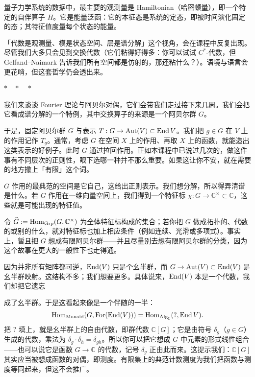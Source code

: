 量子力学系统的数据中，最主要的观测量是 Hamiltonian（哈密顿量），即一个特定的自伴算子 $H$。它是能量泛函：它的本征态是系统的定态，即被时间演化固定的态；其特征值度量每个状态的能量。

「代数是观测量、模是状态空间、层是谱分解」这个视角，会在课程中反复出现。尽管我们大多只会见到交换代数（它们粘得好得多：你可以试试 $C^*$-代数，但 Gelfand–Naimark 告诉我们所有空间都是仿射的，那还粘什么？）。语境与语言会更花哨，但这套哲学仍会透出来。

\begin{center}
$\ast\quad\ast\quad\ast$
\end{center}

我们来谈谈 Fourier 理论与阿贝尔对偶，它们会带我们走过接下来几周。我们会把它看成谱分解的一个特例，其中交换算子的来源是一个阿贝尔群 $G$。

于是，固定阿贝尔群 $G$ 与表示 $T:G\to\operatorname{Aut}(V)\subset\operatorname{End} V$。我们把 $g\in G$ 在 $V$ 上的作用记作 $T_g$。通常，考虑 $G$ 在空间 $X$ 上的作用、再取 $X$ 上的函数，就能造出这类表示的好例子。此时 $G$ 通过拉回作用。正如本课程中已说过几次的，做这件事有不同层次的正则性，眼下选哪一种并不那么重要。如果这让你不安，就在需要的地方撒上「有限」这个词。

$G$ 作用的最典范的空间是它自己，这给出正则表示。我们想分解，所以得弄清谱是什么。若 $G$ 作用在一维向量空间上，我们得到一个特征标 $\chi:G\to\mathbb{C}^\times\subset\mathbb{C}$，这些就是可能出现的特征值。

令 $\widehat{G}:=\operatorname{Hom}_{\mathrm{Grp}}(G,\mathbb{C}^\times)$ 为全体特征标构成的集合；若你把 $G$ 做成拓扑的、代数的或别的什么，就对特征标也加上相应条件（例如连续、光滑或多项式）。事实上，暂且把 $G$ 想成有限阿贝尔群——并且尽量别去想有限阿贝尔群的分类，因为这个故事在更大的一般性下也走得通。

因为并非所有矩阵都可逆，$\operatorname{End}(V)$ 只是个幺半群，而 $G\to\operatorname{Aut}(V)\subset\operatorname{End}(V)$ 是幺半群映射。这结构不多；我们想要更多。具体说来，$\operatorname{End}(V)$ 本是一个代数，我们却把它遗忘


成了幺半群。于是这看起来像是一个伴随的一半：
\[
\operatorname{Hom}_{\mathrm{Monoid}}(G,\mathrm{For}(\operatorname{End}(V)))=\operatorname{Hom}_{\mathrm{Alg}_{\mathbb{C}}}(?,\operatorname{End} V).
\]
把 $?$ 填上，就是幺半群上的自由代数，即群代数 $\mathbb{C}[G]$；它是由符号 $\delta_g$（$g\in G$）生成的代数，乘法为 $\delta_g\cdot\delta_h=\delta_{gh}$。所以你可以把它想成 $G$ 中元素的形式线性组合——也可以说它是函数 $G\to\mathbb{C}$ 的代数，记号 $\delta_g$ 正由此而来。这提示我们：$\mathbb{C}[G]$ 其实应当被想成函数的对偶，即测度。有限集上的典范计数测度为我们把函数与测度等同起来，但这不会推广。

